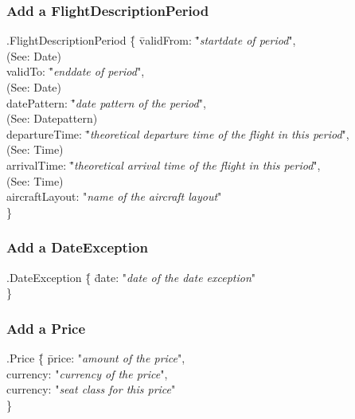 \documentclass[a4paper,11pt]{article}
\begin{document}
\subsubsection*{Add a FlightDescriptionPeriod}
\begin{tabbing}
.FlightDescriptionPeriod \= \{ \= validFrom: \= "\textit{startdate of period}", \\
		\> \> \>(See:\renewcommand\refname{} \refname{Date}) \\
	\> \> validTo: \= "\textit{enddate of period}", \\
		\> \> \> (See:\renewcommand\refname{} \refname{Date}) \\
	\> \> datePattern: \= "\textit{date pattern of the period}", \\
		\> \> \> (See:\renewcommand\refname{} \refname{Datepattern}) \\
	\> \> departureTime: \= "\textit{theoretical departure time of the flight in this period}", \\
		\> \> \> (See:\renewcommand\refname{} \refname{Time}) \\
	\> \> arrivalTime: \= "\textit{theoretical arrival time of the flight in this period}", \\
		\> \> \> 	(See:\renewcommand\refname{} \refname{Time}) \\
	\> \> aircraftLayout: "\textit{name of the aircraft layout}" \\
\> \} \\
\end{tabbing}

\subsubsection*{Add a DateException}
\begin{tabbing}
.DateException \= \{ \= date: "\textit{date of the date exception}" \\
\> \} \\
\end{tabbing}

\subsubsection*{Add a Price}
\begin{tabbing}
.Price \= \{ \= price: "\textit{amount of the price}", \\
	\> \> currency: "\textit{currency of the price}", \\
	\> \> currency: "\textit{seat class for this price}" \\
\> \} \\
\end{tabbing}
\end{document}
